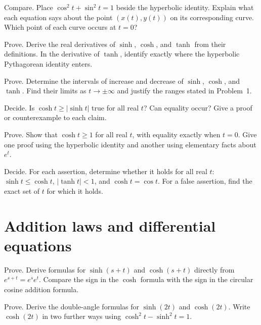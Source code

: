 \documentclass{workbook}
\begin{document}
\begin{problem}{Compare.}
Place $\cos^2t+\sin^2t=1$ beside the hyperbolic identity. Explain what
each equation says about the point $(x(t),y(t))$ on its corresponding curve.
Which point of each curve occurs at $t=0$?
\end{problem}

\begin{problem}{Prove.}
Derive the real derivatives of $\sinh$, $\cosh$, and $\tanh$ from their
definitions. In the derivative of $\tanh$, identify exactly where the
hyperbolic Pythagorean identity enters.
\end{problem}

\begin{problem}{Prove.}
Determine the intervals of increase and decrease of $\sinh$, $\cosh$,
and $\tanh$. Find their limits as $t\to\pm\infty$ and justify the ranges
stated in Problem~1.
\end{problem}

\begin{problem}{Decide.}
Is $\cosh t\geq|\sinh t|$ true for all real $t$? Can equality occur?
Give a proof or counterexample to each claim.
\end{problem}

\begin{problem}{Prove.}
Show that $\cosh t\geq1$ for all real $t$, with equality exactly when
$t=0$. Give one proof using the hyperbolic identity and another using
elementary facts about $e^t$.
\end{problem}

\begin{problem}{Decide.}
For each assertion, determine whether it holds for all real $t$:
$\sinh t\leq\cosh t$, $|\tanh t|<1$, and $\cosh t=\cos t$.
For a false assertion, find the exact set of $t$ for which it holds.
\end{problem}

\section{Addition laws and differential equations}

\begin{problem}{Prove.}
Derive formulas for $\sinh(s+t)$ and $\cosh(s+t)$ directly from
$e^{s+t}=e^se^t$. Compare the sign in the $\cosh$ formula with the sign
in the circular cosine addition formula.
\end{problem}

\begin{problem}{Prove.}
Derive the double-angle formulas for $\sinh(2t)$ and $\cosh(2t)$.
Write $\cosh(2t)$ in two further ways using
$\cosh^2t-\sinh^2t=1$.
\end{problem}
\end{document}
